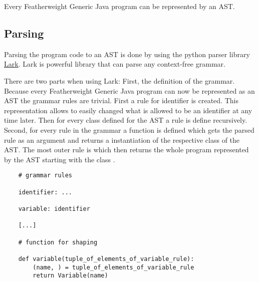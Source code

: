 Every Featherweight Generic Java program can be represented by an AST.

\subsection{Parsing}

Parsing the program code to an AST is done by using the python parser library \href{https://lark-parser.readthedocs.io/en/stable/}{Lark}.
Lark is powerful library that can parse any context-free grammar.

There are two parts when using Lark:
First, the definition of the grammar.
Because every Featherweight Generic Java program can now be represented as an AST the grammar rules are trivial.
First a rule for identifier is created. This representation allows to easily changed what is allowed to be an identifier at any time later.
Then for every class defined for the AST a rule is define recursively.
Second, for every rule in the grammar a function is defined which gets the parsed rule as an argument and returns a instantiation of the respective class of the AST.
The most outer rule is  which then returns the whole program represented by the AST starting with the class .

\begin{verbatim}
    # grammar rules

    identifier: ...

    variable: identifier

    [...]

    # function for shaping

    def variable(tuple_of_elements_of_variable_rule):
        (name, ) = tuple_of_elements_of_variable_rule
        return Variable(name)
\end{verbatim}
